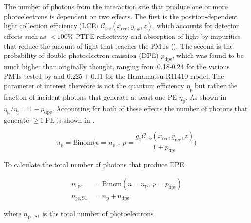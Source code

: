 The number of photons from the interaction site that produce one or more photoelectrons is dependent on two effects.  The first is
the position-dependent light collection efficiency (LCE) $\mathcal{C}_{\mathrm{lce}}(x_{\mathrm{rec}}, y_{\mathrm{rec}}, z)$, which
accounts for detector effects such as $<100\%$ PTFE reflectivity and
absorption of light by impurities that reduce the amount of light that reaches the PMTs
().  The second is the probability of double photoelectron emission (DPE) $p_{\mathrm{dpe}}$, which was found
to be much higher than originally thought, ranging from 0.18-0.24 for the various PMTs tested by  and $0.225 \pm 0.01$
for the Hamamatsu R11410 model.  The parameter of interest therefore is not the quantum efficiency $\eta_{\mathrm{\mu}}$ but rather the
fraction of incident photons that generate at least one PE $\eta_{\mathrm{p}}$.  As shown in 
$\eta_{\mathrm{\mu}} / \eta_{\mathrm{p}} = 1 + p_{\mathrm{dpe}}$.  Accounting for both of these effects the number of photons that
generate $\geq 1\ \mathrm{PE}$ is shown in .

\begin{equation}
n_{\mathrm{p}} = \mathrm{Binom} \bigg( n = n_{\mathrm{ph}},\ p =
\frac{g_1 \mathcal{C}_{\mathrm{lce}}(x_{\mathrm{rec}}, y_{\mathrm{rec}}, z)}{1 + p_{\mathrm{dpe}}} \bigg)
\label{eq:er_nr_calibrations_parameter_determ_det_phys_npe}
\end{equation}

To calculate the total number of photons that produce DPE

\begin{subequations}
\begin{align}
n_{\mathrm{dpe}} &= \mathrm{Binom} (n = n_{\mathrm{p}},\ p = p_{\mathrm{dpe}} ) \\
n_{\mathrm{pe,S1}} &= n_{\mathrm{p}} + n_{\mathrm{dpe}}
\end{align}
\label{eq:er_nr_calibrations_parameter_determ_det_phys_num_pe}
\end{subequations}

\noindent where $n_{\mathrm{pe,S1}}$ is the total number of photoelectrons.

